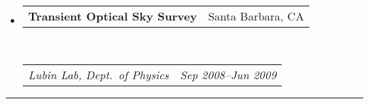 \documentclass[10pt,letterpaper]{article}
\makeatletter
\newcommand{\headerrow}[2]
{\begin{tabular*}{\linewidth}{l@{\extracolsep{\fill}}r}
	#1 &
	#2 \\
\end{tabular*}}
\makeatother
\begin{document}
\begin{itemize}
	\item
	\headerrow
		{\textbf{Transient Optical Sky Survey}}
		{Santa Barbara, CA}	\\
	\headerrow
		{\emph{Lubin Lab, Dept.~of Physics}}
		{\emph{Sep 2008--Jun 2009}}
\end{itemize}


\hrule
\end{document}
